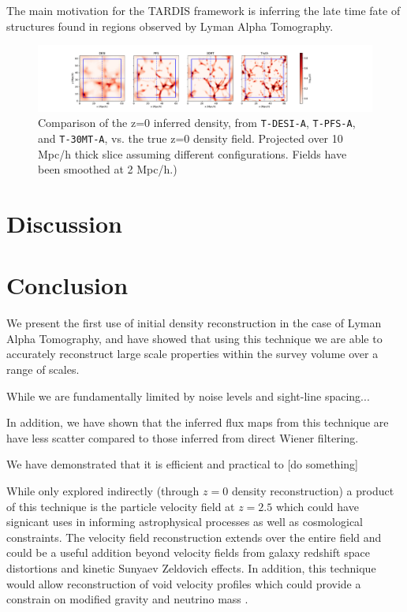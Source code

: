 \documentclass[times]{aastex62}
\begin{document}
The main motivation for the TARDIS framework is inferring the late time fate of structures found in regions observed by Lyman Alpha Tomography. 

\begin{figure}
  \centering  \includegraphics[trim=3cm 0cm 0cm 0cm,width=1.2\textwidth]{./figs_treepm/z=0_density.pdf}
    \caption{Comparison of the z=0 inferred density, from \texttt{T-DESI-A}, \texttt{T-PFS-A}, and \texttt{T-30MT-A}, vs. the true z=0 density field. Projected over 10 Mpc/h thick slice assuming different configurations. Fields have been smoothed at 2 Mpc/h.)} 
    \label{fig_config}
\end{figure}




\section{Discussion}

\section{Conclusion}


We present the first use of initial density reconstruction in the case of Lyman Alpha Tomography, and have showed that using this technique we are able to accurately reconstruct large scale properties within the survey volume over a range of scales.

While we are fundamentally limited by noise levels and sight-line spacing...

In addition, we have shown that the inferred flux maps from this technique are have less scatter compared to those inferred from direct Wiener filtering.

We have demonstrated that it is efficient and practical to [do something]

While only explored indirectly (through $z=0$ density reconstruction) a product of this technique is the particle velocity field at $z=2.5$ which could have signicant uses in informing astrophysical processes as well as cosmological constraints. The velocity field reconstruction extends over the entire field and could be a useful addition beyond velocity fields from galaxy redshift space distortions and kinetic Sunyaev Zeldovich effects.\cite{2017Sugiyama} In addition, this technique would allow reconstruction of void velocity profiles which could provide a constrain on modified gravity \cite{2018Falck} and neutrino mass \cite{2015Massara}.
\end{document}
